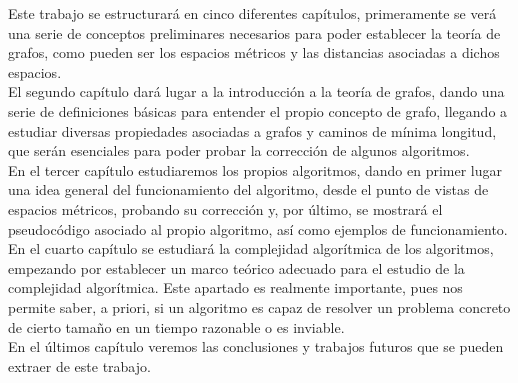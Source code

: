 Este trabajo se estructurará en cinco diferentes capítulos, primeramente se verá una serie de conceptos preliminares necesarios para poder establecer la teoría de grafos, como pueden ser los espacios métricos y las distancias asociadas a dichos espacios. \\

El segundo capítulo dará lugar a la introducción a la teoría de grafos, dando una serie de definiciones básicas para entender el propio concepto de grafo, llegando a estudiar diversas propiedades asociadas a grafos y caminos de mínima longitud, que serán esenciales para poder probar la corrección de algunos algoritmos. \\

En el tercer capítulo estudiaremos los propios algoritmos, dando en primer lugar una idea general del funcionamiento del algoritmo, desde el punto de vistas de espacios métricos, probando su corrección y, por último, se mostrará el pseudocódigo asociado al propio algoritmo, así como ejemplos de funcionamiento. \\

En el cuarto capítulo se estudiará la complejidad algorítmica de los algoritmos, empezando por establecer un marco teórico adecuado para el estudio de la complejidad algorítmica. Este apartado es realmente importante, pues nos permite saber, a priori, si un algoritmo es capaz de resolver un problema concreto de cierto tamaño en un tiempo razonable o es inviable. \\

En el últimos capítulo veremos las conclusiones y trabajos futuros que se pueden extraer de este trabajo. \\


\endinput
